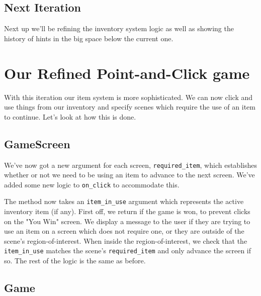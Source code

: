 \documentclass[a4paper,11pt,openany]{book}
\begin{document}
\subsection{Next Iteration}

Next up we'll be refining the inventory system logic as well as showing the history of hints in the big space below the current one. 

\newpage

\section{Our Refined Point-and-Click game}

With this iteration our item system is more sophisticated. We can now click and use things from our inventory and specify scenes which require the use of an item to continue. Let's look at how this is done.



\subsection{GameScreen}

We've now got a new argument for each screen, \lstinline[columns=fixed]{required_item}, which establishes whether or not we need to be using an item to advance to the next screen. We've added some new logic to \lstinline[columns=fixed]{on_click} to accommodate this. 

\vspace{5mm}

The method now takes an \lstinline[columns=fixed]{item_in_use} argument which represents the active inventory item (if any). First off, we return if the game is won, to prevent clicks on the "You Win" screen. We display a message to the user if they are trying to use an item on a screen which does not require one, or they are outside of the scene's region-of-interest. When inside the region-of-interest, we check that the \lstinline[columns=fixed]{item_in_use} matches the scene's \lstinline[columns=fixed]{required_item} and only advance the screen if so. The rest of the logic is the same as before. 

\subsection{Game}
\end{document}
